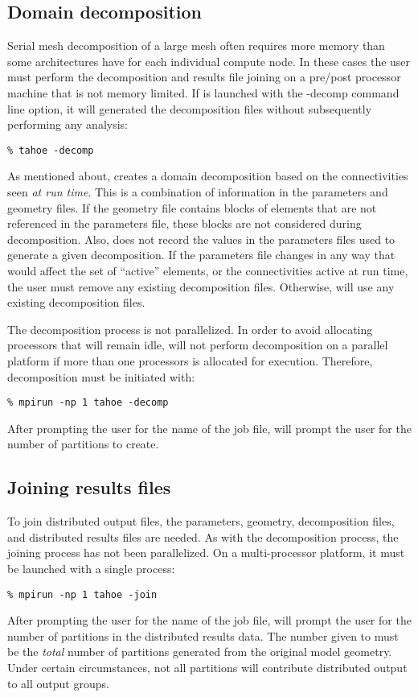 \subsection{Domain decomposition}
\label{sect.domain.decomp}
Serial mesh decomposition of a large mesh often requires more memory than
some architectures have for each individual compute node.  In these cases
the user must perform the decomposition and results file joining on a
pre/post processor machine that is not memory limited.  If \tahoe is
launched with the -decomp command line option, it will generated the
decomposition files without subsequently performing any analysis:
\begin{center}
\texttt{\% tahoe -decomp}
\end{center}
As mentioned about, \tahoe creates a domain decomposition based on the
connectivities seen \emph{at run time}.  This is a combination of information in
the parameters and geometry files.  If the geometry file contains blocks of
elements that are not referenced in the parameters file, these blocks are
not considered during decomposition.  Also, \tahoe does not record the
values in the parameters files used to generate a given decomposition.  If
the parameters file changes in any way that would affect the set of
``active'' elements, or the connectivities active at run time, the user must
remove any existing decomposition files.  Otherwise, \tahoe will use any
existing decomposition files.

The decomposition process is not parallelized.  In order to avoid
allocating processors that will remain idle, \tahoe will not perform
decomposition on a parallel platform if more than one processors is
allocated for execution.  Therefore, decomposition must be initiated 
with:
\begin{center}
\texttt{\% mpirun -np 1 tahoe -decomp}
\end{center}
After prompting the user for the name of the job file, \tahoe will prompt
the user for the number of partitions to create.

\subsection{Joining results files}
\label{sect.joining}
To join distributed output files, the parameters, geometry, decomposition
files, and distributed results files are needed.  As with the decomposition
process, the joining process has not been parallelized.  On a
multi-processor platform, it must be launched with a single process:
\begin{center}
\texttt{\% mpirun -np 1 tahoe -join}
\end{center}
After prompting the user for the name of the job file, \tahoe will prompt
the user for the number of partitions in the distributed results data.  The
number given to \tahoe must be the \emph{total} number of partitions generated from
the original model geometry.  Under certain circumstances, not all
partitions will contribute distributed output to all output groups.

